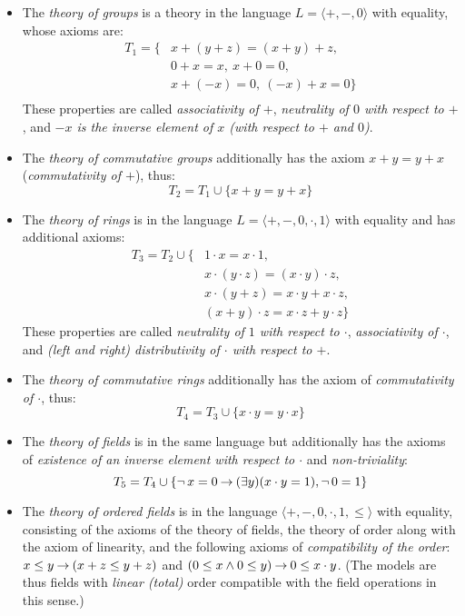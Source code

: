 \begin{itemize}
    \item The \emph{theory of groups} is a theory in the language $L=\langle +,-,0\rangle$ with equality, whose axioms are:
    \begin{align*}
        T_1=\{& x + (y + z) = (x + y) + z,\\
            & 0 + x = x,\ x + 0 = 0,\\
            & x + (-x) = 0,\ (-x) + x = 0\}\\
    \end{align*}
    These properties are called \emph{associativity of $+$}, \emph{neutrality of $0$ with respect to $+$}, and \emph{$-x$ is the inverse element of $x$ (with respect to $+$ and $0$)}.
    \item The \emph{theory of commutative groups} additionally has the axiom $x+y=y+x$ (\emph{commutativity of $+$}), thus:
    $$
    T_2=T_1\cup\{x+y=y+x\}
    $$
    \item The \emph{theory of rings} is in the language $L=\langle +,-,0,\cdot,1\rangle$ with equality and has additional axioms:
    \begin{align*}
        T_3=T_2\cup\{   & 1 \cdot x = x \cdot 1,\\
        & x \cdot (y \cdot z) = (x \cdot y) \cdot z,\\
        & x \cdot (y + z) = x \cdot y + x \cdot z,\\
        & (x + y) \cdot z = x \cdot z + y \cdot z\}
    \end{align*}
    These properties are called \emph{neutrality of $1$ with respect to $\cdot$}, \emph{associativity of $\cdot$}, and \emph{(left and right) distributivity of $\cdot$ with respect to $+$}.
    \item The \emph{theory of commutative rings} additionally has the axiom of \emph{commutativity of $\cdot$}, thus:
    $$
    T_4 = T_3 \cup \{x \cdot y = y \cdot x\}
    $$
    \item The \emph{theory of fields} is in the same language but additionally has the axioms of \emph{existence of an inverse element with respect to $\cdot$} and \emph{non-triviality}:
    $$
    T_5 = T_4 \cup \{\neg\,x=0 \mathbin{\rightarrow} (\exists y)(x\cdot y = 1), \neg\,0=1\}
    $$
    \item The \emph{theory of ordered fields} is in the language $\langle +, -, 0,\cdot,1,\leq\rangle$ with equality, consisting of the axioms of the theory of fields, the theory of order along with the axiom of linearity, and the following axioms of \emph{compatibility of the order}: $x\leq y\mathbin{\rightarrow} (x+z\leq y+z)$ and $(0\leq x\land 0\leq y)\mathbin{\rightarrow} 0\leq x\cdot y$. (The models are thus fields with \emph{linear (total)} order compatible with the field operations in this sense.)
\end{itemize}


